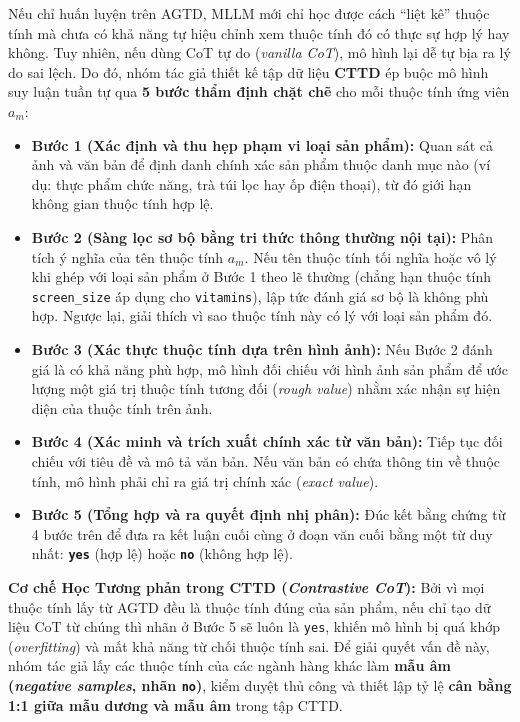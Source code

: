 \documentclass[conference,10pt]{IEEEtran}
\begin{document}
Nếu chỉ huấn luyện trên AGTD, MLLM mới chỉ học được cách ``liệt kê'' thuộc tính mà chưa có khả năng tự hiệu chỉnh xem thuộc tính đó có thực sự hợp lý hay không. Tuy nhiên, nếu dùng CoT tự do (\textit{vanilla CoT}), mô hình lại dễ tự bịa ra lý do sai lệch. Do đó, nhóm tác giả thiết kế tập dữ liệu \textbf{CTTD} ép buộc mô hình suy luận tuần tự qua \textbf{5 bước thẩm định chặt chẽ} cho mỗi thuộc tính ứng viên $a_m$:
\begin{itemize}
    \item \textbf{Bước 1 (Xác định và thu hẹp phạm vi loại sản phẩm):} Quan sát cả ảnh và văn bản để định danh chính xác sản phẩm thuộc danh mục nào (ví dụ: thực phẩm chức năng, trà túi lọc hay ốp điện thoại), từ đó giới hạn không gian thuộc tính hợp lệ.
    \item \textbf{Bước 2 (Sàng lọc sơ bộ bằng tri thức thông thường nội tại):} Phân tích ý nghĩa của tên thuộc tính $a_m$. Nếu tên thuộc tính tối nghĩa hoặc vô lý khi ghép với loại sản phẩm ở Bước 1 theo lẽ thường (chẳng hạn thuộc tính \texttt{screen\_size} áp dụng cho \texttt{vitamins}), lập tức đánh giá sơ bộ là không phù hợp. Ngược lại, giải thích vì sao thuộc tính này có lý với loại sản phẩm đó.
    \item \textbf{Bước 3 (Xác thực thuộc tính dựa trên hình ảnh):} Nếu Bước 2 đánh giá là có khả năng phù hợp, mô hình đối chiếu với hình ảnh sản phẩm để ước lượng một giá trị thuộc tính tương đối (\textit{rough value}) nhằm xác nhận sự hiện diện của thuộc tính trên ảnh.
    \item \textbf{Bước 4 (Xác minh và trích xuất chính xác từ văn bản):} Tiếp tục đối chiếu với tiêu đề và mô tả văn bản. Nếu văn bản có chứa thông tin về thuộc tính, mô hình phải chỉ ra giá trị chính xác (\textit{exact value}).
    \item \textbf{Bước 5 (Tổng hợp và ra quyết định nhị phân):} Đúc kết bằng chứng từ 4 bước trên để đưa ra kết luận cuối cùng ở đoạn văn cuối bằng một từ duy nhất: \textbf{\texttt{yes}} (hợp lệ) hoặc \textbf{\texttt{no}} (không hợp lệ).
\end{itemize}

\textbf{Cơ chế Học Tương phản trong CTTD (\textit{Contrastive CoT}):} Bởi vì mọi thuộc tính lấy từ AGTD đều là thuộc tính đúng của sản phẩm, nếu chỉ tạo dữ liệu CoT từ chúng thì nhãn ở Bước 5 sẽ luôn là \texttt{yes}, khiến mô hình bị quá khớp (\textit{overfitting}) và mất khả năng từ chối thuộc tính sai. Để giải quyết vấn đề này, nhóm tác giả lấy các thuộc tính của các ngành hàng khác làm \textbf{mẫu âm (\textit{negative samples}, nhãn \texttt{no})}, kiểm duyệt thủ công và thiết lập tỷ lệ \textbf{cân bằng 1:1 giữa mẫu dương và mẫu âm} trong tập CTTD.
\end{document}
